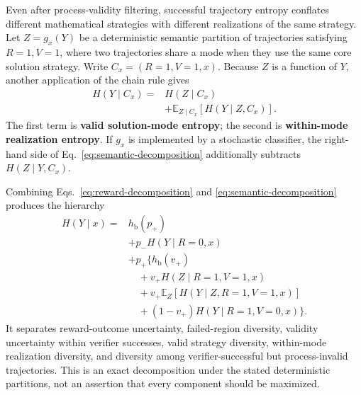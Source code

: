 \documentclass[letterpaper]{article} %
\begin{document}
Even after process-validity filtering, successful trajectory entropy conflates different mathematical strategies with different realizations of the same strategy. Let \(Z=g_x(Y)\) be a deterministic semantic partition of trajectories satisfying \(R=1,V=1\), where two trajectories share a mode when they use the same core solution strategy. Write \(C_x=(R=1,V=1,x)\). Because \(Z\) is a function of \(Y\), another application of the chain rule gives
\begin{equation}
\begin{aligned}
H(Y\mid C_x)
={}&H(Z\mid C_x)\\
&+\mathbb{E}_{Z\mid C_x}
  [H(Y\mid Z,C_x)].
\end{aligned}
\label{eq:semantic-decomposition}
\end{equation}
The first term is \textbf{valid solution-mode entropy}; the second is \textbf{within-mode realization entropy}. If \(g_x\) is implemented by a stochastic classifier, the right-hand side of Eq.~\eqref{eq:semantic-decomposition} additionally subtracts \(H(Z\mid Y,C_x)\).

Combining Eqs.~\eqref{eq:reward-decomposition} and \eqref{eq:semantic-decomposition} produces the hierarchy
\begin{equation}
\begin{aligned}
H(Y\mid x)
={}&h_{\mathrm b}(p_+)\\
&+p_-H(Y\mid R=0,x)\\
&+p_+\big\{h_{\mathrm b}(v_+)\\
&\quad+v_+H(Z\mid R=1,V=1,x)\\
&\quad+v_+\mathbb{E}_Z[
  H(Y\mid Z,R=1,V=1,x)]\\
&\quad+(1-v_+)H(Y\mid R=1,V=0,x)\big\}.
\end{aligned}
\end{equation}
It separates reward-outcome uncertainty, failed-region diversity, validity uncertainty within verifier successes, valid strategy diversity, within-mode realization diversity, and diversity among verifier-successful but process-invalid trajectories. This is an exact decomposition under the stated deterministic partitions, not an assertion that every component should be maximized.
\end{document}
